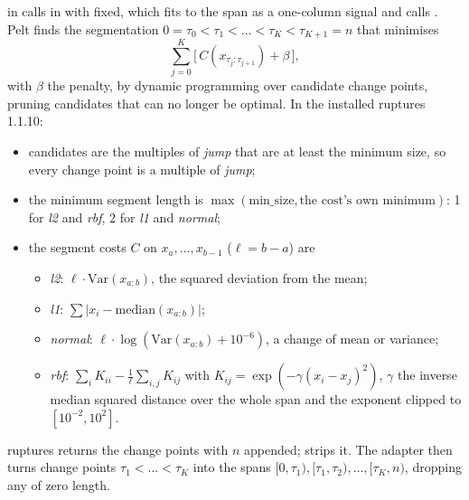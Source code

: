  in  calls  in
 with  fixed, which fits
 \citep{truong2020selective} to the span as a one-column signal and
calls . Pelt \citep{killick2012optimal} finds the segmentation
$0 = \tau_0 < \tau_1 < \dots < \tau_K < \tau_{K+1} = n$ that minimises
\[ \sum_{j=0}^{K} \bigl[\, C(x_{\tau_j:\tau_{j+1}}) + \beta \,\bigr], \]
with $\beta$ the penalty, by dynamic programming over candidate change points, pruning
candidates that can no longer be optimal. In the installed ruptures 1.1.10:
\begin{itemize}
\item candidates are the multiples of \emph{jump} that are at least the minimum size, so
  every change point is a multiple of \emph{jump};
\item the minimum segment length is $\max(\text{min\_size}, \text{the cost's own minimum})$:
  1 for \emph{l2} and \emph{rbf}, 2 for \emph{l1} and \emph{normal};
\item the segment costs $C$ on $x_a,\dots,x_{b-1}$ ($\ell = b-a$) are
  \begin{itemize}
  \item \emph{l2}: $\ell\cdot\mathrm{Var}(x_{a:b})$, the squared deviation from the mean;
  \item \emph{l1}: $\sum |x_i - \mathrm{median}(x_{a:b})|$;
  \item \emph{normal}: $\ell\cdot\log(\mathrm{Var}(x_{a:b}) + 10^{-6})$, a change of mean or
    variance;
  \item \emph{rbf}: $\sum_i K_{ii} - \frac{1}{\ell}\sum_{i,j} K_{ij}$ with
    $K_{ij} = \exp(-\gamma (x_i-x_j)^2)$, $\gamma$ the inverse median squared distance over
    the whole span and the exponent clipped to $[10^{-2}, 10^2]$.
  \end{itemize}
\end{itemize}
ruptures returns the change points with $n$ appended;  strips
it. The adapter then turns change points $\tau_1<\dots<\tau_K$ into the spans
$[0,\tau_1), [\tau_1,\tau_2), \dots, [\tau_K, n)$, dropping any of zero length.


